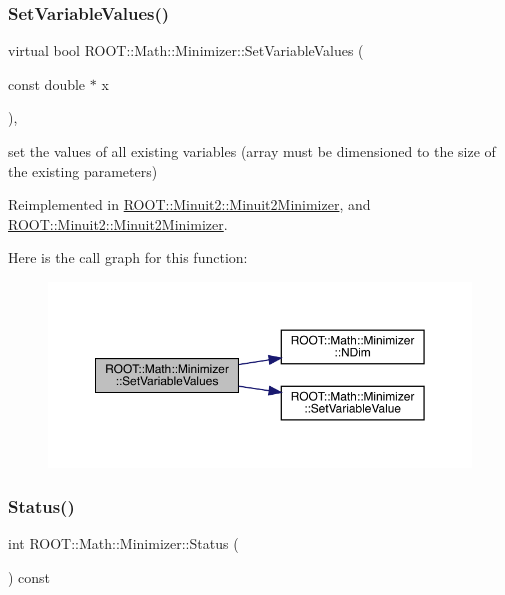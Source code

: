 \subsubsection{\texorpdfstring{SetVariableValues()}{SetVariableValues()}\hspace{0.1cm}{\footnotesize\ttfamily [2/2]}}
{\footnotesize\ttfamily virtual bool R\+O\+O\+T\+::\+Math\+::\+Minimizer\+::\+Set\+Variable\+Values (\begin{DoxyParamCaption}\item[{const double $\ast$}]{x }\end{DoxyParamCaption})\hspace{0.3cm}{\ttfamily [inline]}, {\ttfamily [virtual]}}



set the values of all existing variables (array must be dimensioned to the size of the existing parameters) 



Reimplemented in \mbox{\hyperlink{classROOT_1_1Minuit2_1_1Minuit2Minimizer_a9511e9711f3d1505556af30046c87d03}{R\+O\+O\+T\+::\+Minuit2\+::\+Minuit2\+Minimizer}}, and \mbox{\hyperlink{classROOT_1_1Minuit2_1_1Minuit2Minimizer_a9511e9711f3d1505556af30046c87d03}{R\+O\+O\+T\+::\+Minuit2\+::\+Minuit2\+Minimizer}}.

Here is the call graph for this function\+:
\nopagebreak
\begin{figure}[H]
\begin{center}
\leavevmode
\includegraphics[width=350pt]{dc/dc4/classROOT_1_1Math_1_1Minimizer_ac8368efbd59da8e0b8bc0a0966309609_cgraph}
\end{center}
\end{figure}
\mbox{\label{classROOT_1_1Math_1_1Minimizer_a634833b3a6e525ef10605de5fd051499}} 
\subsubsection{\texorpdfstring{Status()}{Status()}\hspace{0.1cm}{\footnotesize\ttfamily [1/2]}}
{\footnotesize\ttfamily int R\+O\+O\+T\+::\+Math\+::\+Minimizer\+::\+Status (\begin{DoxyParamCaption}{ }\end{DoxyParamCaption}) const\hspace{0.3cm}{\ttfamily [inline]}}



